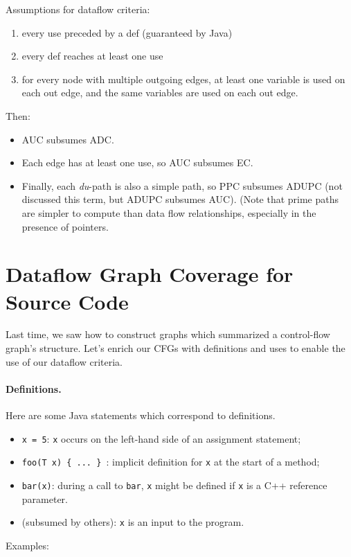 \documentclass[11pt]{article}
\begin{document}
Assumptions for dataflow criteria:
\begin{enumerate}
\item every use preceded by a def (guaranteed by Java)
\item every def reaches at least one use
\item for every node with multiple outgoing edges, at least 
one variable is used on each out edge, and the same variables
are used on each out edge.
\end{enumerate}

Then: 
\begin{itemize}
\item AUC subsumes ADC.
\item Each edge has at least one use, so AUC subsumes EC.
\item Finally, each {\em du}-path is also a simple path, so PPC
  subsumes ADUPC (not discussed this term, but ADUPC subsumes
  AUC). (Note that prime paths are simpler to compute than data flow
  relationships, especially in the presence of pointers.
\end{itemize}

\section*{Dataflow Graph Coverage for Source Code}

Last time, we saw how to construct graphs which summarized
a control-flow graph's structure. Let's enrich our CFGs with
definitions and uses to enable the use of our dataflow criteria.

\paragraph{Definitions.} Here are some Java statements which
correspond to definitions.

\begin{itemize}
\item {\tt x = 5}: {\tt x} occurs on the left-hand side of
an assignment statement;
\item {\tt foo(T x) \{ ... \} }: implicit definition for {\tt x}
at the start of a method;
\item {\tt bar(x)}: during a call to {\tt bar}, {\tt x} might
be defined if {\tt x} is a C++ reference parameter.
\item (subsumed by others): {\tt x} is an input to the program.
\end{itemize}

{\sf Examples:} \\[2em]
\end{document}
